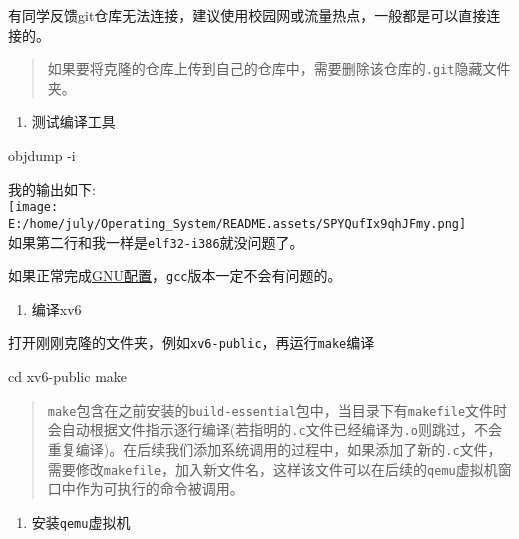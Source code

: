 \documentclass{article}
\newenvironment{Shaded}{}{}
\newcommand{\AttributeTok}[1]{\textcolor[rgb]{0.49,0.56,0.16}{#1}}
\newcommand{\BuiltInTok}[1]{\textcolor[rgb]{0.00,0.50,0.00}{#1}}
\newcommand{\ExtensionTok}[1]{#1}
\newcommand{\FunctionTok}[1]{\textcolor[rgb]{0.02,0.16,0.49}{#1}}
\newcommand{\NormalTok}[1]{#1}
\begin{document}
有同学反馈git仓库无法连接，建议使用校园网或流量热点，一般都是可以直接连接的。

\begin{quote}
  如果要将克隆的仓库上传到自己的仓库中，需要删除该仓库的\texttt{.git}隐藏文件夹。
\end{quote}

\begin{enumerate}
  \def\labelenumi{\arabic{enumi}.}
  \item
        测试编译工具
\end{enumerate}

\begin{Shaded}
  \begin{Highlighting}[]
    \ExtensionTok{objdump} \AttributeTok{{-}i}
  \end{Highlighting}
\end{Shaded}

我的输出如下:\\
\texttt{[image: E:/home/july/Operating\_System/README.assets/SPYQufIx9qhJFmy.png]}\\
如果第二行和我一样是\texttt{elf32-i386}就没问题了。

如果正常完成\hyperref[GNU]{GNU配置}，\texttt{gcc}版本一定不会有问题的。

\begin{enumerate}
  \def\labelenumi{\arabic{enumi}.}
  \item
        编译xv6
\end{enumerate}

打开刚刚克隆的文件夹，例如\texttt{xv6-public}，再运行\texttt{make}编译

\begin{Shaded}
  \begin{Highlighting}[]
    \BuiltInTok{cd}\NormalTok{ xv6{-}public}
    \FunctionTok{make}
  \end{Highlighting}
\end{Shaded}

\begin{quote}
  \texttt{make}包含在之前安装的\texttt{build-essential}包中，当目录下有\texttt{makefile}文件时会自动根据文件指示逐行编译(若指明的\texttt{.c}文件已经编译为\texttt{.o}则跳过，不会重复编译)。在后续我们添加系统调用的过程中，如果添加了新的\texttt{.c}文件，需要修改\texttt{makefile}，加入新文件名，这样该文件可以在后续的\texttt{qemu}虚拟机窗口中作为可执行的命令被调用。
\end{quote}

\begin{enumerate}
  \def\labelenumi{\arabic{enumi}.}
  \item
        安装\texttt{qemu}虚拟机
\end{enumerate}
\end{document}
